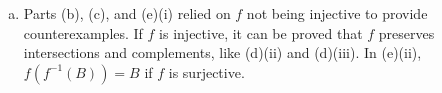 \documentclass[12pt]{article}
\begin{document}
\begin{enumerate}[(a)]
\begin{enumerate}[(i)]
                  \item$f(f^{-1}(B)) \ne B$.
                        \begin{proof}
                              Consider $y \in T$ such that $y$ is not in the image of $f$. Consider
                              $B \subset T$ such that $y \in B$. Since there does not exist $x$ in
                              $f^{-1}(B)$ such that $f(x) = y$, $y \notin f(f^{-1}(B))$
                        \end{proof}
            \end{enumerate}

      \item
            Parts (b), (c), and (e)(i) relied on $f$ not being injective to provide
            counterexamples. If $f$ is injective, it can be proved that $f$ preserves
            intersections and complements, like (d)(ii) and (d)(iii). In (e)(ii), $f(f^{-1}(B))= B$
            if $f$ is surjective.
\end{enumerate}
\end{document}
